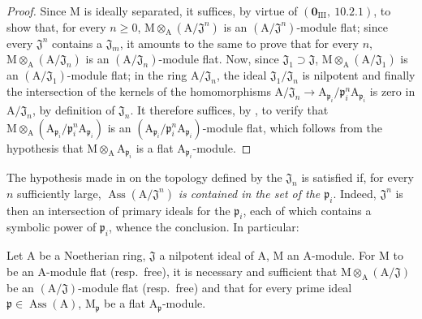 \begin{proof}
Since $\mathrm{M}$ is ideally separated, it suffices, by virtue of $(\mathbf{0}_{\mathrm{III}},~10.2.1)$, to show
that, for every $n\geq 0$, $\mathrm{M}\otimes_\mathrm{A}(\mathrm{A}/\mathfrak{J}^n)$ is an $(\mathrm{A}/\mathfrak{J}^n)$-module flat; since every $\mathfrak{J}^n$ contains
a $\mathfrak{J}_m$, it amounts to the same to prove that for every $n$, $\mathrm{M}\otimes_\mathrm{A}(\mathrm{A}/\mathfrak{J}_n)$ is an $(\mathrm{A}/\mathfrak{J}_n)$-module
flat. Now, since $\mathfrak{J}_1\supset\mathfrak{J}$, $\mathrm{M}\otimes_\mathrm{A}(\mathrm{A}/\mathfrak{J}_1)$ is an $(\mathrm{A}/\mathfrak{J}_1)$-module flat; in the ring $\mathrm{A}/\mathfrak{J}_n$,
the ideal $\mathfrak{J}_1/\mathfrak{J}_n$ is nilpotent and finally the intersection of the kernels of the homomorphisms
$\mathrm{A}/\mathfrak{J}_n\to\mathrm{A}_{\mathfrak{p}_i}/\mathfrak{p}_i^n\mathrm{A}_{\mathfrak{p}_i}$ is zero in $\mathrm{A}/\mathfrak{J}_n$, by definition of $\mathfrak{J}_n$. It therefore suffices, by ,
to verify that $\mathrm{M}\otimes_\mathrm{A}(\mathrm{A}_{\mathfrak{p}_i}/\mathfrak{p}_i^n\mathrm{A}_{\mathfrak{p}_i})$ is an $(\mathrm{A}_{\mathfrak{p}_i}/\mathfrak{p}_i^n\mathrm{A}_{\mathfrak{p}_i})$-module flat, which follows from
the hypothesis that $\mathrm{M}\otimes_\mathrm{A}\mathrm{A}_{\mathfrak{p}_i}$ is a flat $\mathrm{A}_{\mathfrak{p}_i}$-module.
\end{proof}

\begin{remark}[11.4.8]
\label{IV.11.4.8}
The hypothesis made in  on the topology defined
by the $\mathfrak{J}_n$ is satisfied if, for every $n$ sufficiently large, $\operatorname{Ass}(\mathrm{A}/\mathfrak{J}^n)$ \emph{is contained in the set
of the $\mathfrak{p}_i$}. Indeed, $\mathfrak{J}^n$ is then an intersection of primary ideals for the $\mathfrak{p}_i$, each of which
contains a symbolic power of $\mathfrak{p}_i$, whence the conclusion. In particular:
\end{remark}

\begin{corollary}[11.4.9]
\label{IV.11.4.9}
Let $\mathrm{A}$ be a Noetherian ring, $\mathfrak{J}$ a nilpotent ideal of $\mathrm{A}$, $\mathrm{M}$ an
$\mathrm{A}$-module. For $\mathrm{M}$ to be an $\mathrm{A}$-module flat (resp.\ free), it is necessary and sufficient that $\mathrm{M}\otimes_\mathrm{A}(\mathrm{A}/\mathfrak{J})$
be an $(\mathrm{A}/\mathfrak{J})$-module flat (resp.\ free) and that for every prime ideal $\mathfrak{p}\in\operatorname{Ass}(\mathrm{A})$, $\mathrm{M}_\mathfrak{p}$ be a flat
$\mathrm{A}_\mathfrak{p}$-module.
\end{corollary}

